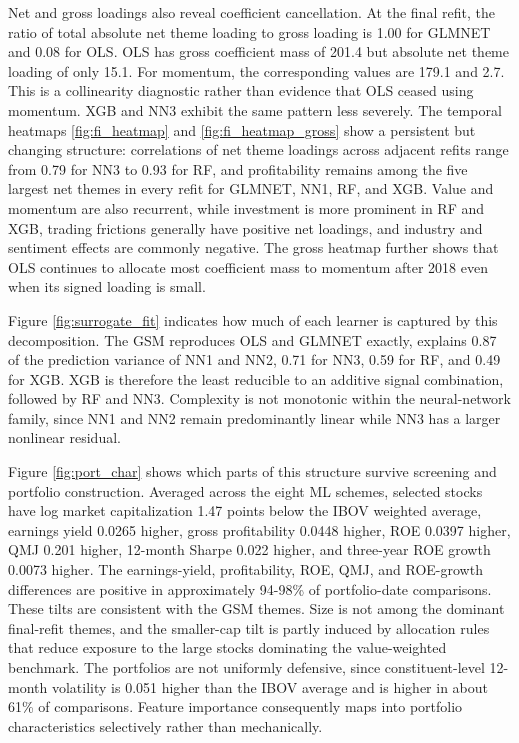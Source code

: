 \documentclass[preprint,12pt,authoryear]{elsarticle}
\begin{document}
Net and gross loadings also reveal coefficient cancellation. At the final refit, the ratio of total absolute net theme loading to gross loading is 1.00 for GLMNET and 0.08 for OLS. OLS has gross coefficient mass of 201.4 but absolute net theme loading of only 15.1. For momentum, the corresponding values are 179.1 and 2.7. This is a collinearity diagnostic rather than evidence that OLS ceased using momentum. XGB and NN3 exhibit the same pattern less severely. The temporal heatmaps \ref{fig:fi_heatmap} and \ref{fig:fi_heatmap_gross} show a persistent but changing structure: correlations of net theme loadings across adjacent refits range from 0.79 for NN3 to 0.93 for RF, and profitability remains among the five largest net themes in every refit for GLMNET, NN1, RF, and XGB. Value and momentum are also recurrent, while investment is more prominent in RF and XGB, trading frictions generally have positive net loadings, and industry and sentiment effects are commonly negative. The gross heatmap further shows that OLS continues to allocate most coefficient mass to momentum after 2018 even when its signed loading is small.

Figure \ref{fig:surrogate_fit} indicates how much of each learner is captured by this decomposition. The GSM reproduces OLS and GLMNET exactly, explains 0.87 of the prediction variance of NN1 and NN2, 0.71 for NN3, 0.59 for RF, and 0.49 for XGB. XGB is therefore the least reducible to an additive signal combination, followed by RF and NN3. Complexity is not monotonic within the neural-network family, since NN1 and NN2 remain predominantly linear while NN3 has a larger nonlinear residual. 

Figure \ref{fig:port_char} shows which parts of this structure survive screening and portfolio construction. Averaged across the eight ML schemes, selected stocks have log market capitalization 1.47 points below the IBOV weighted average, earnings yield 0.0265 higher, gross profitability 0.0448 higher, ROE 0.0397 higher, QMJ 0.201 higher, 12-month Sharpe 0.022 higher, and three-year ROE growth 0.0073 higher. The earnings-yield, profitability, ROE, QMJ, and ROE-growth differences are positive in approximately 94-98\% of portfolio-date comparisons. These tilts are consistent with the GSM themes. Size is not among the dominant final-refit themes, and the smaller-cap tilt is partly induced by allocation rules that reduce exposure to the large stocks dominating the value-weighted benchmark. The portfolios are not uniformly defensive, since constituent-level 12-month volatility is 0.051 higher than the IBOV average and is higher in about 61\% of comparisons. Feature importance consequently maps into portfolio characteristics selectively rather than mechanically.
\end{document}
